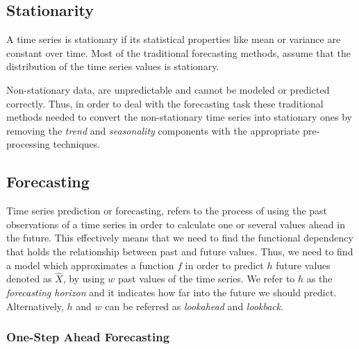 \documentclass[a4paper, 12pt]{article}
\numberwithin{equation}{section}
\numberwithin{figure}{section}
\numberwithin{table}{section}
\begin{document}
	\subsection{Stationarity} \label{stationarity}
	
	A time series is stationary if its statistical properties like mean or variance  are constant over time. Most of the traditional forecasting methods,  assume that the distribution of the time series values is stationary.\par
	Non-stationary data, are unpredictable and cannot be modeled or predicted correctly. Thus, in order to deal with the forecasting task these traditional methods needed to convert  the non-stationary time series into stationary ones by removing the \textit{trend} and \textit{seasonality} components with the appropriate pre-processing techniques.
	
	\subsection{Forecasting}
	
	Time series prediction or forecasting, refers to the process of using the past observations of a time series in order to calculate one or several values ahead in the future. This effectively means that we need to find the functional dependency that holds the relationship between past and future values.  Thus, we need to find a model which approximates a function $f$
	in order to predict $h$ future values  denoted as $\hat{X}$, by using $w$ past values of the time series. We refer to $h$ as the \textit{forecasting horizon} and it indicates how far into the future we should predict. Alternatively, $h$ and $w$ can be referred as \textit{lookahead} and \textit{lookback}.
	
	

	\subsubsection{One-Step Ahead Forecasting}
	
\end{document}

